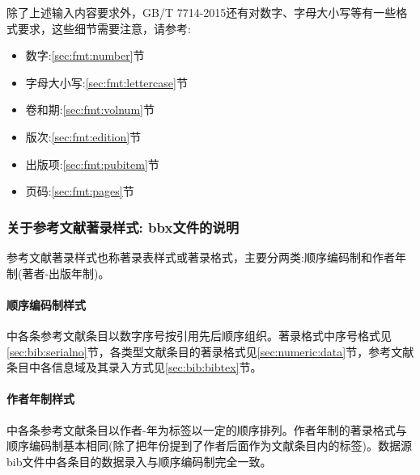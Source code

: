 除了上述输入内容要求外，GB/T 7714-2015还有对数字、字母大小写等有一些格式要求，这些细节需要注意，请参考:
\begin{itemize}
\item 数字:\ref{sec:fmt:number}节
\item 字母大小写:\ref{sec:fmt:lettercase}节
\item 卷和期:\ref{sec:fmt:volnum}节
\item 版次:\ref{sec:fmt:edition}节
\item 出版项:\ref{sec:fmt:pubitem}节
\item 页码:\ref{sec:fmt:pages}节
\end{itemize}



\subsubsection{关于参考文献著录样式: bbx文件的说明}\label{sec:usage:bbx}
参考文献著录样式也称著录表样式或著录格式，主要分两类:顺序编码制和作者年制(著者-出版年制)。

\paragraph{顺序编码制样式}中各条参考文献条目以数字序号按引用先后顺序组织。著录格式中序号格式见\ref{sec:bib:serialno}节，各类型文献条目的著录格式见\ref{sec:numeric:data}节，参考文献条目中各信息域及其录入方式见\ref{sec:bib:bibtex}节。

\paragraph{作者年制样式}中各条参考文献条目以作者-年为标签以一定的顺序排列。作者年制的著录格式与顺序编码制基本相同(除了把年份提到了作者后面作为文献条目内的标签)。数据源bib文件中各条目的数据录入与顺序编码制完全一致。


